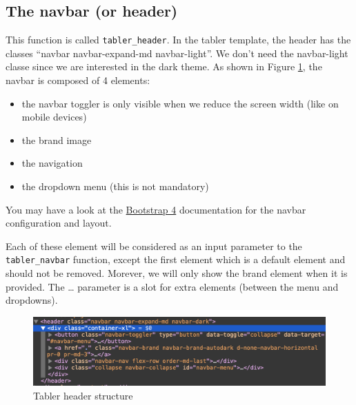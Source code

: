 \documentclass[]{book}
\providecommand{\tightlist}{%
  \setlength{\itemsep}{0pt}\setlength{\parskip}{0pt}}
\begin{document}
\hypertarget{the-navbar-or-header}{%
\subsection{The navbar (or header)}\label{the-navbar-or-header}}

This function is called \texttt{tabler\_header}. In the tabler template, the header has the classes ``navbar navbar-expand-md navbar-light''. We don't need the navbar-light classe since we are interested in the dark theme. As shown in Figure \ref{fig:tabler-header}, the navbar is composed of 4 elements:

\begin{itemize}
\tightlist
\item
  the navbar toggler is only visible when we reduce the screen width (like on mobile devices)
\item
  the brand image
\item
  the navigation
\item
  the dropdown menu (this is not mandatory)
\end{itemize}

You may have a look at the \href{https://getbootstrap.com/docs/4.0/components/navbar/}{Bootstrap 4} documentation for the navbar configuration and layout.

Each of these element will be considered as an input parameter to the \texttt{tabler\_navbar} function, except the first element which is a default element and should not be removed. Morever, we will only show the brand element when it is provided. The \ldots{} parameter is a slot for extra elements (between the menu and dropdowns).

\begin{figure}
\includegraphics[width=15.94in]{images/practice/tabler-header} \caption{Tabler header structure}\label{fig:tabler-header}
\end{figure}
\end{document}
